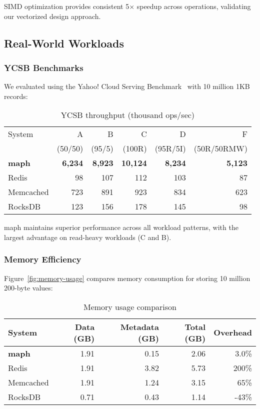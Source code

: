 \documentclass[10pt,conference]{IEEEtran}
\begin{document}
SIMD optimization provides consistent 5× speedup across operations, validating our vectorized design approach.

\subsection{Real-World Workloads}

\subsubsection{YCSB Benchmarks}
We evaluated using the Yahoo! Cloud Serving Benchmark~\cite{ycsb} with 10 million 1KB records:

\begin{table}[htbp]
\centering
\caption{YCSB throughput (thousand ops/sec)}
\label{tab:ycsb}
\begin{tabular}{lrrrrr}
\toprule
System & A & B & C & D & F \\
& (50/50) & (95/5) & (100R) & (95R/5I) & (50R/50RMW) \\
\midrule
\textbf{maph} & \textbf{6,234} & \textbf{8,923} & \textbf{10,124} & \textbf{8,234} & \textbf{5,123} \\
Redis & 98 & 107 & 112 & 103 & 87 \\
Memcached & 723 & 891 & 923 & 834 & 623 \\
RocksDB & 123 & 156 & 178 & 145 & 98 \\
\bottomrule
\end{tabular}
\end{table}

maph maintains superior performance across all workload patterns, with the largest advantage on read-heavy workloads (C and B).

\subsubsection{Memory Efficiency}
Figure~\ref{fig:memory-usage} compares memory consumption for storing 10 million 200-byte values:

\begin{table}[htbp]
\centering
\caption{Memory usage comparison}
\label{tab:memory}
\begin{tabular}{lrrrr}
\toprule
System & Data (GB) & Metadata (GB) & Total (GB) & Overhead \\
\midrule
\textbf{maph} & 1.91 & 0.15 & 2.06 & 3.0\% \\
Redis & 1.91 & 3.82 & 5.73 & 200\% \\
Memcached & 1.91 & 1.24 & 3.15 & 65\% \\
RocksDB & 0.71 & 0.43 & 1.14 & -43\% \\
\bottomrule
\end{tabular}
\end{table}
\end{document}
